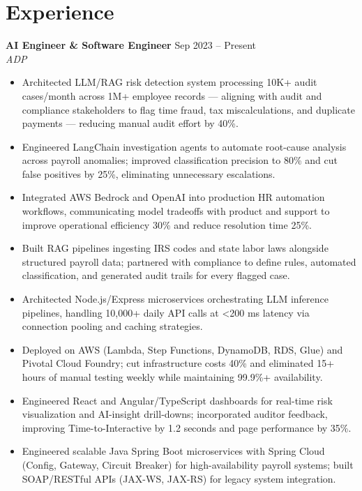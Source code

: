 \documentclass[10pt,letterpaper]{article}
\newcommand{\entry}[3]{%
  \vspace{3pt}\textbf{#1} \hfill #3 \\
  \textit{\small #2}\vspace{1pt}}
\begin{document}
\section{Experience}

\entry{AI Engineer \& Software Engineer}{ADP}{Sep 2023 -- Present}
\begin{itemize}
  \item Architected LLM/RAG risk detection system processing 10K+ audit cases/month across 1M+ employee records --- aligning with audit and compliance stakeholders to flag time fraud, tax miscalculations, and duplicate payments --- reducing manual audit effort by 40\%.
  \item Engineered LangChain investigation agents to automate root-cause analysis across payroll anomalies; improved classification precision to 80\% and cut false positives by 25\%, eliminating unnecessary escalations.
  \item Integrated AWS Bedrock and OpenAI into production HR automation workflows, communicating model tradeoffs with product and support to improve operational efficiency 30\% and reduce resolution time 25\%.
  \item Built RAG pipelines ingesting IRS codes and state labor laws alongside structured payroll data; partnered with compliance to define rules, automated classification, and generated audit trails for every flagged case.
  \item Architected Node.js/Express microservices orchestrating LLM inference pipelines, handling 10,000+ daily API calls at \textless{}200 ms latency via connection pooling and caching strategies.
  \item Deployed on AWS (Lambda, Step Functions, DynamoDB, RDS, Glue) and Pivotal Cloud Foundry; cut infrastructure costs 40\% and eliminated 15+ hours of manual testing weekly while maintaining 99.9\%+ availability.
  \item Engineered React and Angular/TypeScript dashboards for real-time risk visualization and AI-insight drill-downs; incorporated auditor feedback, improving Time-to-Interactive by 1.2 seconds and page performance by 35\%.
  \item Engineered scalable Java Spring Boot microservices with Spring Cloud (Config, Gateway, Circuit Breaker) for high-availability payroll systems; built SOAP/RESTful APIs (JAX-WS, JAX-RS) for legacy system integration.
\end{itemize}
\end{document}
